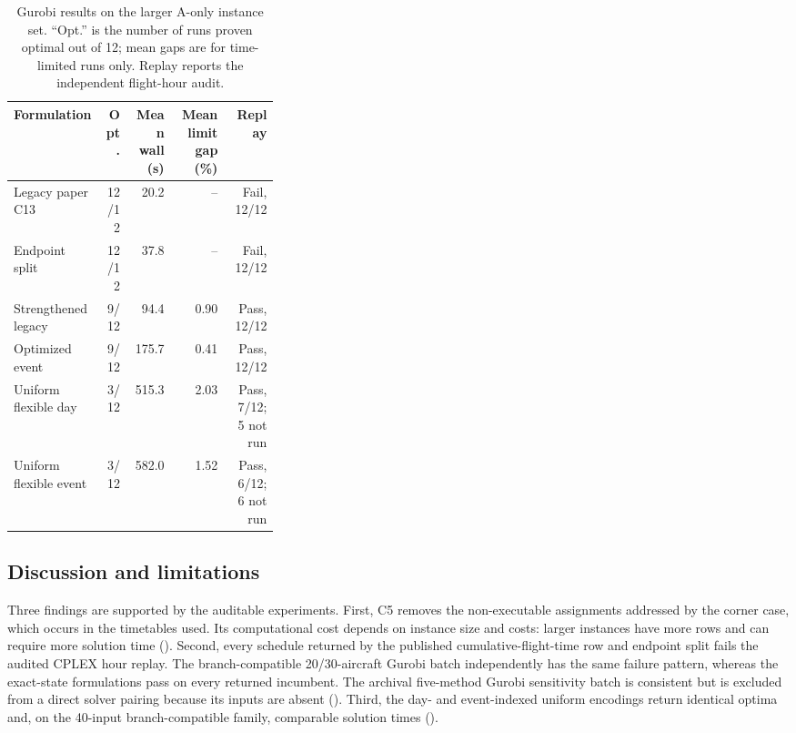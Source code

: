 \begin{table}[t]
\centering\scriptsize
\caption{Gurobi results on the larger A-only instance set. ``Opt.'' is the
number of runs proven optimal out of 12; mean gaps are for time-limited runs
only. Replay reports the independent flight-hour audit.}
\label{tab:large_a_only}
\begin{tabular}{p{0.34\linewidth}rrrr}
\toprule
Formulation & Opt. & Mean wall (s) & Mean limit gap (\%) & Replay \\
\midrule
Legacy paper C13 & 12/12 & 20.2 & -- & Fail, 12/12 \\
Endpoint split & 12/12 & 37.8 & -- & Fail, 12/12 \\
Strengthened legacy & 9/12 & 94.4 & 0.90 & Pass, 12/12 \\
Optimized event & 9/12 & 175.7 & 0.41 & Pass, 12/12 \\
Uniform flexible day & 3/12 & 515.3 & 2.03 & Pass, 7/12; 5 not run \\
Uniform flexible event & 3/12 & 582.0 & 1.52 & Pass, 6/12; 6 not run \\
\bottomrule
\end{tabular}
\end{table}

\subsection{Discussion and limitations}
\label{subsec:robustness}

Three findings are supported by the auditable experiments. First, C5 removes
the non-executable assignments addressed by the corner case, which occurs in
the timetables used. Its computational cost depends on instance size and
costs: larger instances have more rows and can require more solution time
(). Second, every schedule returned by the published
cumulative-flight-time row and endpoint split fails the audited CPLEX hour
replay. The branch-compatible 20/30-aircraft Gurobi batch independently has the
same failure pattern, whereas the exact-state formulations pass on every
returned incumbent. The archival five-method Gurobi sensitivity batch is
consistent but is excluded from a direct solver pairing because its inputs are
absent (). Third, the day- and event-indexed
uniform encodings return identical optima and, on the 40-input branch-compatible
family, comparable solution times ().

